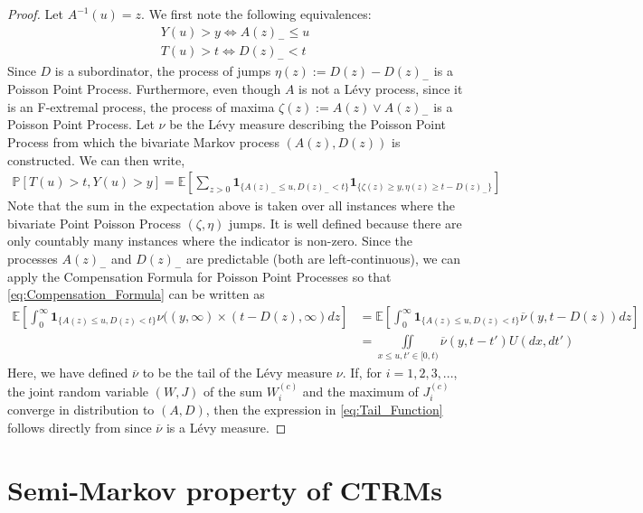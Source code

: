 \documentclass[12pt, a4paper]{article}
\newcommand{\ex}{\mathbb {E}}
\newcommand{\pr}{\mathbb {P}}
\newcommand{\1}{\mathbf 1}
\begin{document}
\begin{proof}
Let $A^{-1}(u)=z$.  We first note the following equivalences:
\begin{align*}
Y(u) > y \iff A(z)_{-} \leq u \\
T(u) > t \iff D(z)_{-} < t
\end{align*}
Since $D$ is a subordinator, the process of jumps $\eta(z):=D(z)-D(z)_{-}$ is a Poisson Point Process. Furthermore, even though $A$ is not a L\'evy process, since it is an F-extremal process, the process of maxima $\zeta(z):=A(z) \vee A(z)_{-}$ is a Poisson Point Process. Let $\nu$ be the L\'evy measure describing the Poisson Point Process from which the bivariate Markov process $(A(z),D(z))$ is constructed. We can then write,
\begin{align}\label{eq:Compensation_Formula}
\pr [T(u) > t, Y(u) > y] = \ex \left[\sum_{z>0} \mathbf 1_{\{A(z)_{-} \leq u, D(z)_{-} < t\}} \mathbf 1_{\{\zeta(z) \geq y , \eta(z) \geq t - D(z)_{-}\}} \right]
\end{align}
Note that the sum in the expectation above is taken over all instances where the bivariate Point Poisson Process $(\zeta, \eta)$ jumps. It is well defined because there are only countably many instances where the indicator is non-zero. Since the processes $A(z)_{-}$ and $D(z)_{-}$ are predictable (both are left-continuous), we can apply the Compensation Formula for Poisson Point Processes so that \eqref{eq:Compensation_Formula} can be written as
\begin{align*}
\ex \left[\int_{0}^{\infty} \mathbf 1_{\{A(z) \leq u, D(z) < t\}} \nu((y,\infty)\times (t-D(z),\infty) dz \right] &= \ex \left[\int_{0}^{\infty} \mathbf 1_{\{A(z) \leq u, D(z) < t\}} \overline{\nu}(y,t-D(z)) dz \right] \\
&= \iint\limits_{x \le u, t' \in [0,t)} \overline \nu(y, t - t') U(dx, dt')
\end{align*}
Here, we have defined $\overline{\nu}$ to be the tail of the L\'evy measure $\nu$. If, for $i=1,2,3,...$, the joint random variable $(W,J)$ of the sum $W_i^{(c)}$ and the maximum of $J_i^{(c)}$ converge in distribution to $(A,D)$, then the expression in \eqref{eq:Tail_Function} follows directly from \cite[Theorem 3.5]{Hees16} since $\overline{\nu}$ is a L\'evy measure.

\end{proof}
\section{Semi-Markov property of CTRMs}
\label{sec:records}
\end{document}
